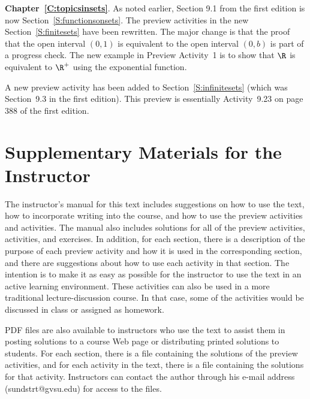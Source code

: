 \vskip6pt
\noindent
\textbf{Chapter~\ref{C:topicsinsets}}.  As noted earlier, Section 9.1 from the first edition is now Section~\ref{S:functionsonsets}.  The preview activities in the new 
Section~\ref{S:finitesets} have been rewritten.  The major change is that the proof that 
 the open interval $(0,1)$ is equivalent to the open interval $(0, b)$ is part of 
a progress check.  The new example in Preview Activity~1 is to show that $\R$ is equivalent to $\R^+$ using the exponential function.

A new preview activity has been added to Section~\ref{S:infinitesets} (which was Section~9.3 in the first edition).  This preview is essentially Activity~9.23 on page 388 of the first edition.  


\section*{Supplementary Materials for the Instructor}
The instructor's manual for this text includes suggestions on how to use the text, how to incorporate writing into the course, and how to use the preview activities and activities.  The manual also includes solutions for all of the preview activities, activities, and exercises.  In addition, for each section, there is a description of the purpose of each preview activity and how it is used in the corresponding section, and there are suggestions about how to use each activity in that section.  The intention is to make it as easy as possible for the instructor to use the text in an active learning environment.  These activities can also be used in a more traditional lecture-discussion course.  In that case, some of the activities would be discussed in class or assigned as homework.


PDF files are also available to instructors who use the text to assist them in posting solutions to a course Web page or distributing printed solutions to students.  For each section, there is a file containing the solutions of the preview activities, and for each activity in the text, there is a file containing the solutions for that activity.  Instructors can contact the author through his e-mail address (sundstrt@gvsu.edu) for access to the files.

